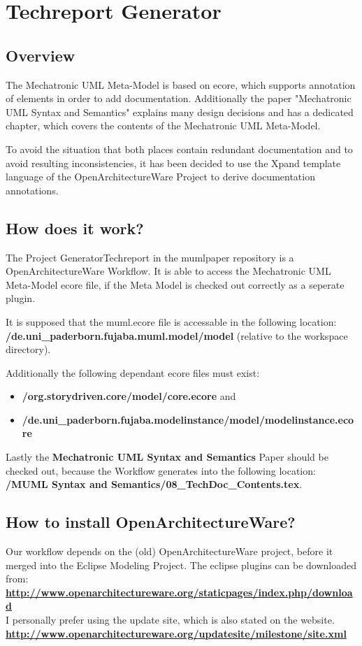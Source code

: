 \chapter{Techreport Generator}
\section{Overview}
The Mechatronic UML Meta-Model is based on ecore, which supports annotation of
elements in order to add documentation.
Additionally the paper "Mechatronic UML Syntax and Semantics" explains many
design decisions and has a dedicated chapter, which covers the contents of the
Mechatronic UML Meta-Model.

To avoid the situation that both places contain redundant documentation and to
avoid resulting inconsistencies, it has been decided to use the Xpand
template language of the OpenArchitectureWare Project to derive documentation
annotations.

\section{How does it work?}
The Project GeneratorTechreport in the mumlpaper repository is a
OpenArchitectureWare Workflow.
It is able to access the Mechatronic UML Meta-Model ecore file, if the Meta
Model is checked out correctly as a seperate plugin.

It is supposed that the muml.ecore file is accessable in the following
location:\\
\textbf{/de.uni\_paderborn.fujaba.muml.model/model}
(relative to the workspace directory).

Additionally the following dependant ecore files must exist:
\begin{itemize}
  \item \textbf{/org.storydriven.core/model/core.ecore} and
  \item \textbf{/de.uni\_paderborn.fujaba.modelinstance/model/modelinstance.ecore}
\end{itemize}

Lastly the \textbf{Mechatronic UML Syntax and Semantics} Paper should be checked
out, because the Workflow generates into the following location:\\
\textbf{/MUML Syntax and Semantics/08\_TechDoc\_Contents.tex}.

\section{How to install OpenArchitectureWare?}
Our workflow depends on the (old) OpenArchitectureWare project, before it merged
into the Eclipse Modeling Project. The eclipse plugins can be downloaded from:\\
\href{http://www.openarchitectureware.org/staticpages/index.php/download}
{\textbf{http://www.openarchitectureware.org/staticpages/index.php/download}}
\\
I personally prefer using the update site, which is also stated on the
website.\\
\href{http://www.openarchitectureware.org/updatesite/milestone/site.xml}
{\textbf{http://www.openarchitectureware.org/updatesite/milestone/site.xml}}

